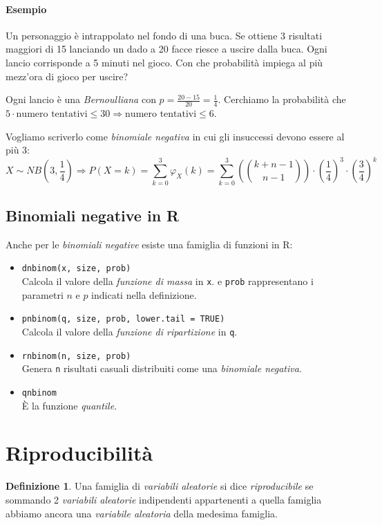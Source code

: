 \documentclass[12pt, a4paper]{report}
\theoremstyle{definition}
\newtheorem{definition}{Definizione}[section]
\begin{document}
\paragraph*{Esempio}
Un personaggio è intrappolato nel fondo di una buca. Se ottiene 3 risultati
maggiori di 15 lanciando un dado a 20 facce riesce a uscire dalla buca. Ogni
lancio corrisponde a 5 minuti nel gioco. Con che probabilità impiega al più
mezz'ora di gioco per uscire?

Ogni lancio è una \emph{Bernoulliana} con \(p=\frac{20-15}{20}=\frac{1}{4}\).
Cerchiamo la probabilità che \(5\cdot \text{numero tentativi}\leq 30\Rightarrow \text
{numero tentativi}\leq 6\).

Vogliamo scriverlo come \emph{binomiale negativa} in cui gli insuccessi devono
essere al più 3:
\[X\sim NB\left(3,\frac{1}{4}\right)\Rightarrow P(X=k)=\sum_{k=0}^3\varphi_X(k)=\sum_
{k=0}^3\left(\binom{k+n-1}{n-1}\right)\cdot \left(\frac{1}{4}\right)^3\cdot \left(\frac{3}
{4}\right)^k\]

\subsection{Binomiali negative in R}
Anche per le \emph{binomiali negative} esiste una famiglia di funzioni in R:
\begin{itemize}
	\item \texttt{dnbinom(x, size, prob)}\\
	Calcola il valore della \emph{funzione di massa} in \texttt{x}. 
	e \texttt{prob} rappresentano i parametri $n$ e $p$ indicati nella definizione.
	\item \texttt{pnbinom(q, size, prob, lower.tail = TRUE)}\\
	Calcola il valore della \emph{funzione di ripartizione} in \texttt{q}.
	\item \texttt{rnbinom(n, size, prob)}\\
	Genera \texttt{n} risultati casuali distribuiti come una \emph{binomiale
	negativa}.
	\item \texttt{qnbinom}\\
	È la funzione \emph{quantile}.
\end{itemize}

\section{Riproducibilità}
\begin{definition}
	Una famiglia di \emph{variabili aleatorie} si dice \emph{riproducibile} se
	sommando 2 \emph{variabili aleatorie} indipendenti appartenenti a quella
	famiglia abbiamo ancora una \emph{variabile aleatoria} della medesima famiglia.
\end{definition}
\end{document}

